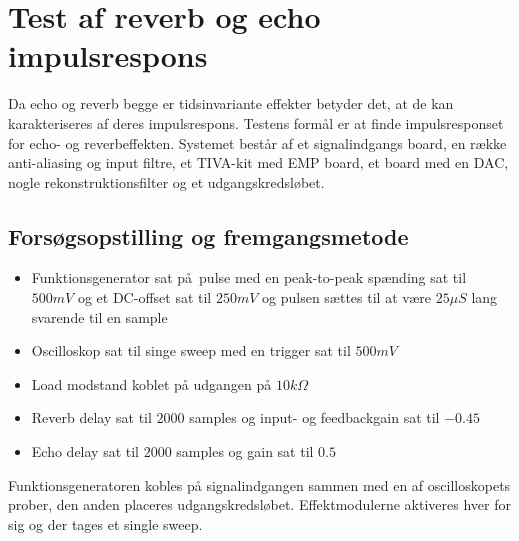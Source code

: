 \chapter{Test af reverb og echo impulsrespons}\label{sec:test_af_effekt}
Da echo og reverb begge er tidsinvariante effekter betyder det, at de kan karakteriseres af deres impulsrespons.\newline
Testens formål er at finde impulsresponset for echo- og reverbeffekten.
Systemet består af et signalindgangs board, en række anti-aliasing og input filtre, et TIVA-kit med EMP board, et board med en DAC, nogle rekonstruktionsfilter og et udgangskredsløbet.
\section{Forsøgsopstilling og fremgangsmetode}
\begin{itemize}
	\item Funktionsgenerator sat på pulse med en peak-to-peak spænding sat til $500\si{mV}$ og et DC-offset sat til $250\si{mV}$ og pulsen sættes til at være $25\si{\mu S}$ lang svarende til en sample
	\item Oscilloskop sat til singe sweep med en trigger sat til $500\si{mV}$
	\item Load modstand koblet på udgangen på $10\si{k\Omega}$
	
	
	\item Reverb delay sat til $2000$ samples og input- og feedbackgain sat til $-0.45$
	\item Echo delay sat til $2000$ samples og gain sat til $0.5$
\end{itemize}
Funktionsgeneratoren kobles på signalindgangen sammen med en af oscilloskopets prober, den anden placeres udgangskredsløbet.\newline
Effektmodulerne aktiveres hver for sig og der tages et single sweep.
